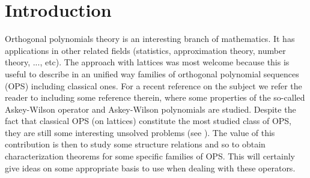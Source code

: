 \documentclass{amsart}
\theoremstyle{remark}
\numberwithin{equation}{section}
\begin{document}
\section{Introduction}
Orthogonal polynomials theory is an interesting branch of mathematics. It has applications in other related fields (statistics, approximation theory, number theory, ..., etc). The approach with lattices was most welcome because this is useful to describe in an unified way families of orthogonal polynomial sequences (OPS) including classical ones. For a recent reference on the subject we refer the reader to \cite{KCDMJP2022} including  some reference therein, where some properties of the so-called Askey-Wilson operator and Askey-Wilson polynomials are studied. Despite the fact that classical OPS (on lattices) constitute the most studied class of OPS, they are still some interesting unsolved problems (see \cite[p. 653]{IsmailBook2005}). The value of this contribution is then to study some structure relations and so to obtain characterization theorems for some specific families of OPS. This will certainly give ideas on some appropriate basis to use when dealing with these operators. %
\end{document}
